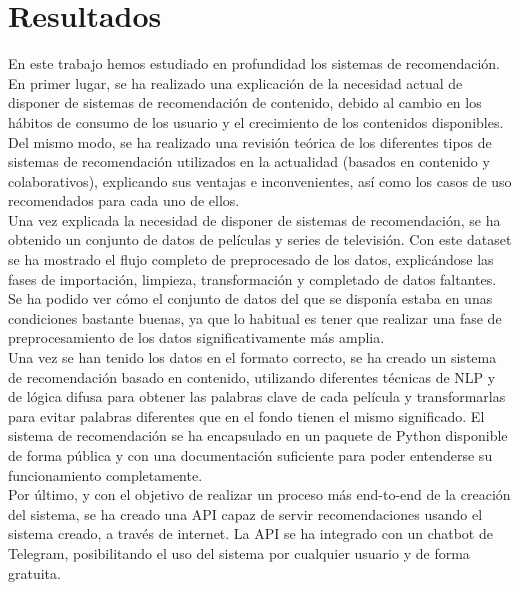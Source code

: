 \chapter{Resultados}\label{chap:resultados}

En este trabajo hemos estudiado en profundidad los sistemas de recomendación. En primer lugar, se ha realizado una explicación de la necesidad actual de disponer de sistemas de recomendación de contenido, debido al cambio en los hábitos de consumo de los usuario y el crecimiento de los contenidos disponibles. Del mismo modo, se ha realizado una revisión teórica de los diferentes tipos de sistemas de recomendación utilizados en la actualidad (basados en contenido y colaborativos), explicando sus ventajas e inconvenientes, así como los casos de uso recomendados para cada uno de ellos.\\

Una vez explicada la necesidad de disponer de sistemas de recomendación, se ha obtenido un conjunto de datos de películas y series de televisión. Con este dataset se ha mostrado el flujo completo de preprocesado de los datos, explicándose las fases de importación, limpieza, transformación y completado de datos faltantes. Se ha podido ver cómo el conjunto de datos del que se disponía estaba en unas condiciones bastante buenas, ya que lo habitual es tener que realizar una fase de preprocesamiento de los datos significativamente más amplia.\\

Una vez se han tenido los datos en el formato correcto, se ha creado un sistema de recomendación basado en contenido, utilizando diferentes técnicas de NLP y de lógica difusa para obtener las palabras clave de cada película y transformarlas para evitar palabras diferentes que en el fondo tienen el mismo significado. El sistema de recomendación se ha encapsulado en un paquete de Python disponible de forma pública y con una documentación suficiente para poder entenderse su funcionamiento completamente.\\

Por último, y con el objetivo de realizar un proceso más end-to-end de la creación del sistema, se ha creado una API capaz de servir recomendaciones usando el sistema creado, a través de internet. La API se ha integrado con un chatbot de Telegram, posibilitando el uso del sistema por cualquier usuario y de forma gratuita.\\

